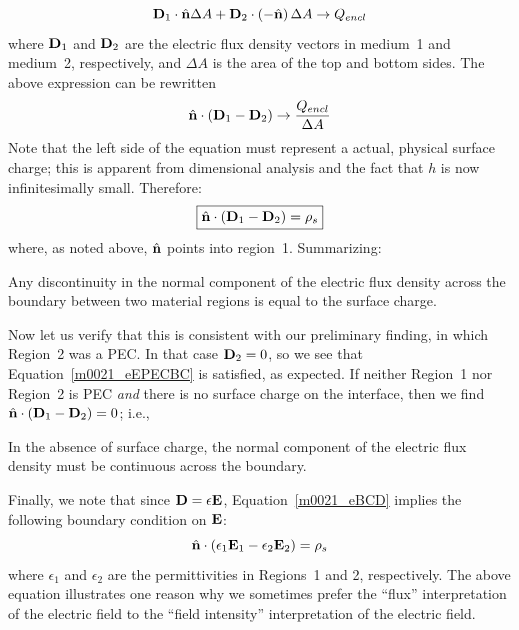%
\begin{equation}
{\bf D}_1 \cdot \hat{\bf n}\Delta A + {\bf D}_2 \cdot \left( -\hat{\bf n} \right) \Delta A \to Q_{encl} 
\end{equation}
%
where ${\bf D}_1$ and ${\bf D}_2$ are the electric flux density vectors in medium~1 and medium~2, respectively,
and $\Delta A$ is the area of the top and bottom sides.  
The above expression can be rewritten
%
\begin{equation}
\hat{\bf n} \cdot \left( {\bf D}_1 - {\bf D}_2 \right) \to
\frac{ Q_{encl} }{\Delta A}   
\end{equation}
%
Note that the left side of the equation must represent a actual, physical surface charge; this is apparent from dimensional analysis and the fact that $h$ is now infinitesimally small.  Therefore:
%
\begin{equation}
\boxed{
\hat{\bf n} \cdot \left( {\bf D}_1 - {\bf D}_2 \right) = \rho_s
}
\label{m0021_eBCD}
\end{equation}       
%
where, as noted above, $\hat{\bf n}$ points into region~1.
Summarizing:
%
\begin{mdframed}[backgroundcolor=yellow!20,nobreak=true] 
Any discontinuity in the normal component of the electric flux density across the boundary between two material regions is equal to the surface charge.
\end{mdframed}

Now let us verify that this is consistent with our preliminary finding, in which Region~2 was a PEC.
In that case ${\bf D}_2=0$, so we see that Equation~\ref{m0021_eEPECBC} is satisfied, as expected.
If neither Region~1 nor Region~2 is PEC \emph{and} there is no surface charge on the interface, then we find 
$\hat{\bf n} \cdot \left( {\bf D}_1 - {\bf D}_2 \right)=0$; i.e.,
%
\begin{mdframed}[backgroundcolor=yellow!20,nobreak=true] 
In the absence of surface charge, the normal component of the electric flux density must be continuous across the boundary.
\end{mdframed}

Finally, we note that since ${\bf D}=\epsilon{\bf E}$, Equation~\ref{m0021_eBCD} implies the following boundary condition on ${\bf E}$:
%
\begin{equation}
\hat{\bf n} \cdot \left( \epsilon_1{\bf E}_1 - \epsilon_2{\bf E}_2 \right) = \rho_s
\label{m0021_eBCE}
\end{equation} 
%
where $\epsilon_1$ and $\epsilon_2$ are the permittivities in Regions~1 and 2, respectively.
The above equation illustrates one reason why we sometimes prefer the ``flux'' interpretation of the electric field to the ``field intensity'' interpretation of the electric field.




